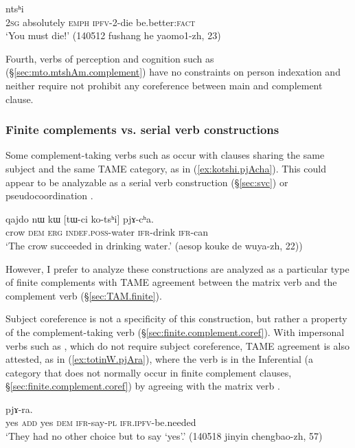  \begin{exe}
\ex \label{ex:pjWtWsi.ntshi}
  ntsʰi\\
 \textsc{2sg} absolutely \textsc{emph} \textsc{ipfv}-2-die be.better:\textsc{fact} \\
 \glt `You must die!' (140512 fushang he yaomo1-zh, 23)
 \end{exe} 
 
 Fourth, verbs of perception and cognition such as  (§\ref{sec:mto.mtshAm.complement}) have no constraints on person indexation and neither require not prohibit any coreference between main and complement clause.

\subsubsection{Finite complements vs. serial verb constructions} \label{sec:svc.finite.agreement}
Some complement-taking verbs such as  occur with clauses sharing the same subject and the same TAME category, as in (\ref{ex:kotshi.pjAcha}). This could appear to be analyzable as a serial verb construction (§\ref{sec:svc}) or pseudocoordination \citep{loedrup14agree}.

\begin{exe}
\ex   \label{ex:kotshi.pjAcha}
\gll qajdo nɯ kɯ [tɯ-ci ko-tsʰi] pjɤ-cʰa. \\
crow \textsc{dem} \textsc{erg} \textsc{indef}.\textsc{poss}-water \textsc{ifr}-drink \textsc{ifr}-can \\
\glt `The crow succeeded in drinking water.' (aesop kouke de wuya-zh, 22))
\end{exe}

However, I prefer to analyze these constructions are analyzed as a particular type of finite complements with TAME agreement between the matrix verb and the complement verb (§\ref{sec:TAM.finite}). 

Subject coreference is not a specificity of this construction, but rather a property of the complement-taking verb (§\ref{sec:finite.complement.coref}). With impersonal verbs such as , which do not require subject coreference, TAME agreement is also attested, as in (\ref{ex:totinW.pjAra}), where the verb  is in the Inferential (a category that does not normally occur in finite complement clauses, §\ref{sec:finite.complement.coref}) by agreeing with the matrix verb . 

\begin{exe}
\ex   \label{ex:totinW.pjAra}
\gll [``ɣa" nɤ ``ɣa" nɯ to-ti-nɯ] pjɤ-ra. \\
yes \textsc{add} yes \textsc{dem} \textsc{ifr}-say-\textsc{pl} \textsc{ifr}.\textsc{ipfv}-be.needed \\
\glt `They had no other choice but to say `yes'.' (140518 jinyin chengbao-zh, 57)
\end{exe}

